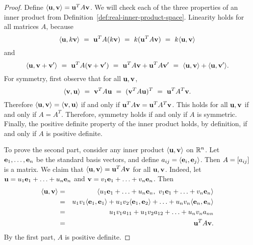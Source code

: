 \begin{proof}
  Define $\iprod{\vect{u},\vect{v}} = \vect{u}^T A \vect{v}$. We will
  check each of the three properties of an inner product from
  Definition~\ref{def:real-inner-product-space}. Linearity holds
  for all matrices $A$, because
  \begin{equation*}
    \iprod{\vect{u},k\vect{v}}
    ~=~ \vect{u}^T A (k\vect{v})
    ~=~ k(\vect{u}^T A \vect{v})
    ~=~ k\iprod{\vect{u},\vect{v}}
  \end{equation*}
  and
  \begin{equation*}
    \iprod{\vect{u},\vect{v}+\vect{v}'}
    ~=~ \vect{u}^T A (\vect{v}+\vect{v}')
    ~=~ \vect{u}^T A \vect{v} + \vect{u}^T A \vect{v}'
    ~=~ \iprod{\vect{u},\vect{v}} + \iprod{\vect{u},\vect{v}'}.
  \end{equation*}
  For symmetry, first observe that for all $\vect{u},\vect{v}$,
  \begin{equation*}
    \iprod{\vect{v},\vect{u}}
    ~=~ \vect{v}^T A \vect{u}
    ~=~ (\vect{v}^T A \vect{u})^T
    ~=~ \vect{u}^T A^T \vect{v}.
  \end{equation*}
  Therefore $\iprod{\vect{u},\vect{v}}=\iprod{\vect{v},\vect{u}}$ if
  and only if $\vect{u}^T A \vect{v} = \vect{u}^T A^T \vect{v}$. This
  holds for all $\vect{u},\vect{v}$ if and only if $A=A^T$. Therefore,
  symmetry holds if and only if $A$ is symmetric.  Finally, the
  positive definite property of the inner product holds, by
  definition, if and only if $A$ is positive definite.

  To prove the second part, consider any inner product
  $\iprod{\vect{u},\vect{v}}$ on $\mathbb{R}^n$. Let
  $\vect{e}_1,\ldots,\vect{e}_n$ be the standard basis vectors, and
  define $a_{ij} = \iprod{\vect{e}_i,\vect{e}_j}$. Then
  $A=\left[a_{ij}\right]$ is a matrix. We claim that
  $\iprod{\vect{u},\vect{v}}=\vect{u}^TA\vect{v}$ for all
  $\vect{u},\vect{v}$. Indeed, let
  $\vect{u}=u_1\vect{e}_1+\ldots+u_n\vect{e}_n$ and
  $\vect{v}=v_1\vect{e}_1+\ldots+v_n\vect{e}_n$. Then
  \begin{eqnarray*}
    \iprod{\vect{u},\vect{v}}
    &=& \iprod{u_1\vect{e}_1+\ldots+u_n\vect{e}_n,~ v_1\vect{e}_1+\ldots+v_n\vect{e}_n} \\
    &=& u_1v_1\iprod{\vect{e}_1, \vect{e}_1}
    +   u_1v_2\iprod{\vect{e}_1, \vect{e}_2}
    + \ldots
    +   u_nv_n\iprod{\vect{e}_n, \vect{e}_n} \\
    &=& u_1v_1a_{11}
    +   u_1v_2a_{12}
    + \ldots
    +   u_nv_na_{nn} \\
    &=& \vect{u}^TA\vect{v}.
  \end{eqnarray*}
  By the first part, $A$ is positive definite.
\end{proof}

